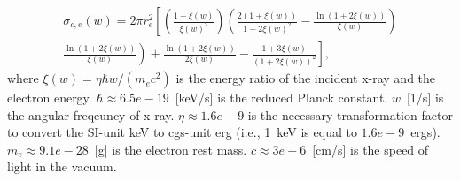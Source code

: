 \documentclass[12pt]{article}
\begin{document}
\begin{multline}
 \sigma_{c,e}(w) = 2\pi r_e^2\left[\left(\frac{1+\xi(w)}{\xi(w)^2}\right) \left(\frac{2(1+\xi(w))}{1+2\xi(w)^2}-\frac{\ln(1+2\xi(w))}{\xi(w)}\right)\right. \\
 \left.\left.\frac{\ln(1+2\xi(w))}{\xi(w)}\right) + \frac{\ln(1+2\xi(w))}{2\xi(w)}-\frac{1+3\xi(w)}{(1+2\xi(w))^2}\right],
\end{multline}
where $\xi(w)=\eta\hbar w/(m_ec^2)$ is the energy ratio of the incident x-ray and the electron energy. $\hbar\approx6.5e-19$~[keV/s] is the reduced Planck constant. $w$~[1/s] is the angular freqeuncy of x-ray. $\eta\approx1.6e-9$ is the necessary transformation factor to convert the SI-unit keV to cgs-unit erg (i.e., 1~keV is equal to $1.6e-9$~ergs). $m_e\approx9.1e-28$~[g] is the electron rest mass. $c\approx3e+6$~[cm/s] is the speed of light in the vacuum.
\end{document}
